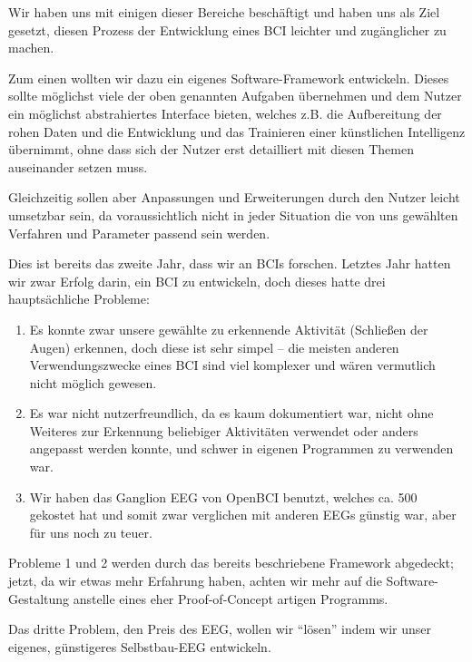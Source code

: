 \documentclass[10pt]{article}
\begin{document}
Wir haben uns mit einigen dieser Bereiche beschäftigt und haben uns als Ziel gesetzt, diesen Prozess der Entwicklung eines BCI leichter und zugänglicher zu machen.

Zum einen wollten wir dazu ein eigenes Software-Framework entwickeln. 
Dieses sollte möglichst viele der oben genannten Aufgaben übernehmen und dem Nutzer ein möglichst abstrahiertes Interface bieten, welches z.B. die Aufbereitung der rohen Daten und die Entwicklung und das Trainieren einer künstlichen Intelligenz übernimmt, ohne dass sich der Nutzer erst detailliert mit diesen Themen auseinander setzen muss.

Gleichzeitig sollen aber Anpassungen und Erweiterungen durch den Nutzer leicht umsetzbar sein, da voraussichtlich nicht in jeder Situation die von uns gewählten Verfahren und Parameter passend sein werden.

Dies ist bereits das zweite Jahr, dass wir an BCIs forschen.
Letztes Jahr hatten wir zwar Erfolg darin, ein BCI zu entwickeln, doch dieses hatte drei hauptsächliche Probleme:

\begin{enumerate}
    \item Es konnte zwar unsere gewählte zu erkennende Aktivität (Schließen der Augen) erkennen, doch diese ist sehr simpel -- die meisten anderen Verwendungszwecke eines BCI sind viel komplexer und wären vermutlich nicht möglich gewesen.
    \item Es war nicht nutzerfreundlich, da es kaum dokumentiert war, nicht ohne Weiteres zur Erkennung beliebiger Aktivitäten verwendet oder anders angepasst werden konnte, und schwer in eigenen Programmen zu verwenden war.
    \item Wir haben das Ganglion EEG von OpenBCI benutzt, welches ca. \SI{500}{\eur} gekostet hat und somit zwar verglichen mit anderen EEGs günstig war, aber für uns noch zu teuer.
\end{enumerate}

Probleme 1 und 2 werden durch das bereits beschriebene Framework abgedeckt; jetzt, da wir etwas mehr Erfahrung haben, achten wir mehr auf die Software-Gestaltung anstelle eines eher Proof-of-Concept artigen Programms.

Das dritte Problem, den Preis des EEG, wollen wir \enquote{lösen} indem wir unser eigenes, günstigeres Selbstbau-EEG entwickeln.
\end{document}
